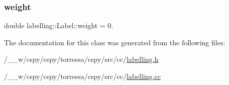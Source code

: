 \mbox{\label{classlabelling_1_1Label_a478f34a67528586877720483c5f0d38b}} 
\subsubsection{\texorpdfstring{weight}{weight}}
{\footnotesize\ttfamily double labelling\+::\+Label\+::weight = 0.}



The documentation for this class was generated from the following files\+:\begin{DoxyCompactItemize}
\item 
/\+\_\+\+\_\+w/cspy/cspy/torressa/cspy/src/cc/\hyperlink{labelling_8h}{labelling.\+h}\item 
/\+\_\+\+\_\+w/cspy/cspy/torressa/cspy/src/cc/\hyperlink{labelling_8cc}{labelling.\+cc}\end{DoxyCompactItemize}
